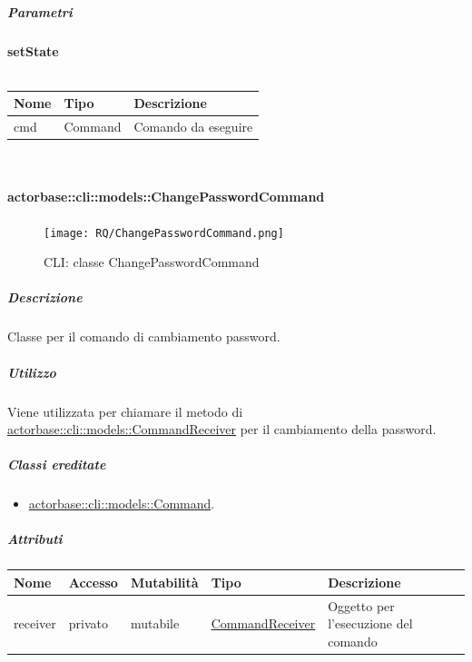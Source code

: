 \documentclass{scalatekids-article}
\begin{document}
\subparagraph{Parametri}

\textbf{setState}\\ \\
\begin{tabular}{| p{3cm} | p{3.5cm} | p{8.5cm} |}
  \hline
  Nome & Tipo & Descrizione\\
  \hline
  cmd & Command & Comando da eseguire\\
  \hline
\end{tabular}\\

\paragraph{actorbase::cli::models::ChangePasswordCommand}
\label{sec:actorbase::cli::models::ChangePasswordCommand}

\begin{figure}[H]
  \begin{center}
    \texttt{[image: RQ/ChangePasswordCommand.png]}
    \caption{CLI: classe ChangePasswordCommand}
  \end{center}
\end{figure}

\subparagraph{Descrizione}

Classe per il comando di cambiamento password.

\subparagraph{Utilizzo}

Viene utilizzata per chiamare il metodo di
\hyperref[sec:actorbase::cli::models::CommandReceiver]{actorbase::cli::models::CommandReceiver} per il cambiamento della password.

\subparagraph{Classi ereditate}

\begin{itemize}
\item \hyperref[sec:actorbase::cli::models::Command]{actorbase::cli::models::Command}.
\end{itemize}

\subparagraph{Attributi}

\begin{tabular}{| p{1cm} | p{1.5cm} | p{2cm} | p{4cm} | p{8.5cm} |}
  \hline
  Nome & Accesso & Mutabilità & Tipo & Descrizione\\
  \hline
  receiver & privato & mutabile & \hyperref[sec:actorbase::cli::models::CommandReceiver]{CommandReceiver} & Oggetto per l'esecuzione del comando\\
  \hline
\end{tabular}
\end{document}

